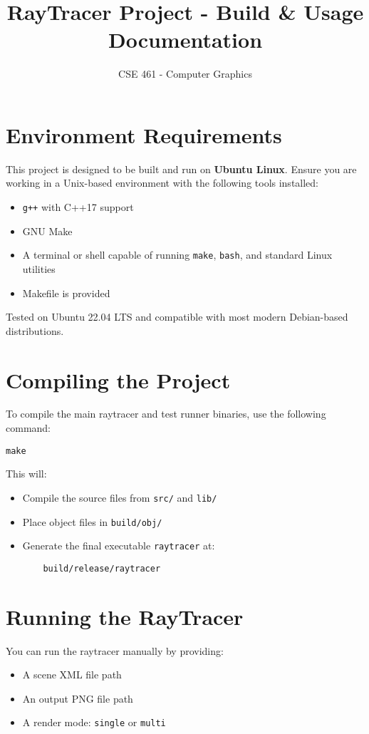 \documentclass[11pt]{article}
\title{\textbf{RayTracer Project - Build \& Usage Documentation}}
\author{CSE 461 - Computer Graphics}
\date{}
\begin{document}
\maketitle

\section*{Environment Requirements}
This project is designed to be built and run on \textbf{Ubuntu Linux}. Ensure you are working in a Unix-based environment with the following tools installed:

\begin{itemize}
    \item \texttt{g++} with C++17 support
    \item GNU Make
    \item A terminal or shell capable of running \texttt{make}, \texttt{bash}, and standard Linux utilities
    \item Makefile is provided
\end{itemize}

Tested on Ubuntu 22.04 LTS and compatible with most modern Debian-based distributions.

\section{Compiling the Project}
To compile the main raytracer and test runner binaries, use the following command:

\begin{lstlisting}
make
\end{lstlisting}

This will:
\begin{itemize}
    \item Compile the source files from \texttt{src/} and \texttt{lib/}
    \item Place object files in \texttt{build/obj/}
    \item Generate the final executable \texttt{raytracer} at:
    \begin{lstlisting}
    build/release/raytracer
    \end{lstlisting}
\end{itemize}

\section{Running the RayTracer}
You can run the raytracer manually by providing:
\begin{itemize}
    \item A scene XML file path
    \item An output PNG file path
    \item A render mode: \texttt{single} or \texttt{multi}
\end{itemize}
\end{document}
